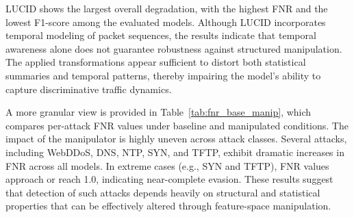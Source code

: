 LUCID shows the largest overall degradation, with the highest FNR and the lowest F1-score among the evaluated models. Although LUCID incorporates temporal modeling of packet sequences, the results indicate that temporal awareness alone does not guarantee robustness against structured manipulation. The applied transformations appear sufficient to distort both statistical summaries and temporal patterns, thereby impairing the model’s ability to capture discriminative traffic dynamics.

A more granular view is provided in Table~\ref{tab:fnr_base_manip}, which compares per-attack FNR values under baseline and manipulated conditions. The impact of the manipulator is highly uneven across attack classes. Several attacks, including WebDDoS, DNS, NTP, SYN, and TFTP, exhibit dramatic increases in FNR across all models. In extreme cases (e.g., SYN and TFTP), FNR values approach or reach 1.0, indicating near-complete evasion. These results suggest that detection of such attacks depends heavily on structural and statistical properties that can be effectively altered through feature-space manipulation.

\begin{table}[htbp]
\centering
\scriptsize
\setlength{\tabcolsep}{4pt}

\caption{False Negative Rate comparison across models under Baseline and Manipulated conditions.}
\label{tab:fnr_base_manip}
\end{table}

